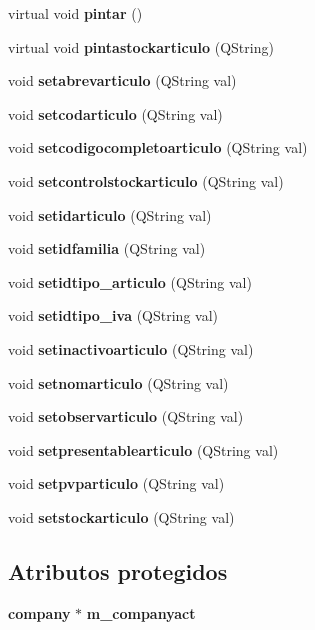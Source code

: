 \begin{CompactItemize}
\item 
virtual void {\bf pintar} ()
\item 
virtual void {\bf pintastockarticulo} (QString)\label{classArticulo_a16}

\item 
void {\bf setabrevarticulo} (QString val)\label{classArticulo_a17}

\item 
void {\bf setcodarticulo} (QString val)\label{classArticulo_a18}

\item 
void {\bf setcodigocompletoarticulo} (QString val)\label{classArticulo_a19}

\item 
void {\bf setcontrolstockarticulo} (QString val)\label{classArticulo_a20}

\item 
void {\bf setidarticulo} (QString val)\label{classArticulo_a21}

\item 
void {\bf setidfamilia} (QString val)\label{classArticulo_a22}

\item 
void {\bf setidtipo\_\-articulo} (QString val)\label{classArticulo_a23}

\item 
void {\bf setidtipo\_\-iva} (QString val)\label{classArticulo_a24}

\item 
void {\bf setinactivoarticulo} (QString val)\label{classArticulo_a25}

\item 
void {\bf setnomarticulo} (QString val)\label{classArticulo_a26}

\item 
void {\bf setobservarticulo} (QString val)\label{classArticulo_a27}

\item 
void {\bf setpresentablearticulo} (QString val)\label{classArticulo_a28}

\item 
void {\bf setpvparticulo} (QString val)\label{classArticulo_a29}

\item 
void {\bf setstockarticulo} (QString val)\label{classArticulo_a30}

\end{CompactItemize}
\subsection*{Atributos protegidos}
\begin{CompactItemize}
\item 
{\bf company} $\ast$ {\bf m\_\-companyact}\label{classArticulo_p0}

\end{CompactItemize}



